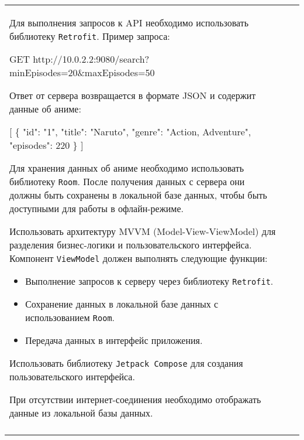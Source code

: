 \documentclass[a4paper]{article}
\begin{document}
\begin{tabular}{!{\vrule width 2pt}p{5cm}|p{6cm}|p{4cm}!{\vrule width 2pt}}
{\begin{minipage}{16cm}
\begin{enumerate}

Для выполнения запросов к API необходимо использовать библиотеку \texttt{Retrofit}. Пример запроса:


GET http://10.0.2.2:9080/search?minEpisodes=20\&maxEpisodes=50


Ответ от сервера возвращается в формате JSON и содержит данные об аниме:


[
  \{
    "id": "1",
    "title": "Naruto",
    "genre": "Action, Adventure",
    "episodes": 220
  \}
]


Для хранения данных об аниме необходимо использовать библиотеку \texttt{Room}. После получения данных с сервера они должны быть сохранены в локальной базе данных, чтобы быть доступными для работы в офлайн-режиме.

Использовать архитектуру MVVM (Model-View-ViewModel) для разделения бизнес-логики и пользовательского интерфейса. Компонент \texttt{ViewModel} должен выполнять следующие функции:
\begin{itemize}
    \item Выполнение запросов к серверу через библиотеку \texttt{Retrofit}.
    \item Сохранение данных в локальной базе данных с использованием \texttt{Room}.
    \item Передача данных в интерфейс приложения.
\end{itemize}

Использовать библиотеку \texttt{Jetpack Compose} для создания пользовательского интерфейса.


При отсутствии интернет-соединения необходимо отображать данные из локальной базы данных. 
\end{enumerate}

\vspace{0.2cm}
    
\end{minipage}
}
\\
\end{tabular}
\end{document}
